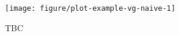 \documentclass[9pt,a4paper,]{extarticle}
\begin{document}
\begin{figure}

{\centering \texttt{[image: figure/plot-example-vg-naive-1]} 

}

\caption{TBC}\label{fig:plot-example-vg-naive}
\end{figure}

{\small}
\end{document}
